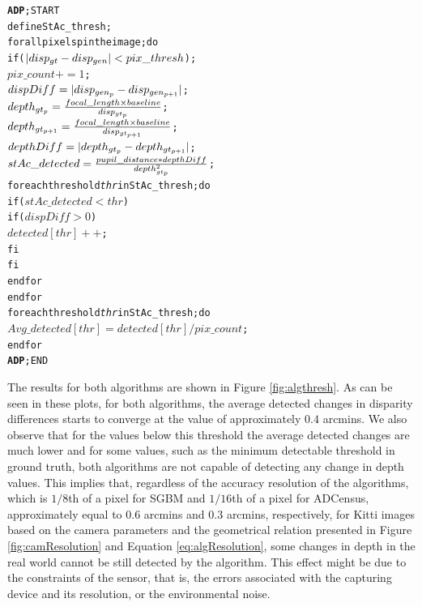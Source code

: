 \begin{alltt}
\textbf{ADP}; START
      define StAc\_thresh;
      for all pixels p in the image; do
         if (\( |disp\sb{gt}-disp\sb{gen}|<pix\_thresh\));
            \(pix\_count += 1\);
            \(dispDiff = |disp\sb{gen\sb{p}}-disp\sb{gen\sb{p+1}}|\);
            \(depth\sb{gt\sb{p}} = \frac{focal\_length \times baseline}{disp\sb{gt\sb{p}}}\);
            \(depth\sb{gt\sb{p+1}} = \frac{focal\_length \times baseline}{disp\sb{gt\sb{p+1}}}\);
            \(depthDiff = |depth\sb{gt\sb{p}}-depth\sb{gt\sb{p+1}}|\);
            \(stAc\_detected = \frac{pupil\_distance*depthDiff}{depth\sb{gt\sb{p}}\sp{2}}\);
            for each threshold \textit{thr} in StAc\_thresh; do
               if (\(stAc\_detected<thr\))
                  if (\(dispDiff>0\))
                     \(detected[thr]++\);
                  fi
               fi
            end for
      end for
      for each threshold \textit{thr} in StAc\_thresh; do
         \(Avg\_detected[thr] = detected[thr]/pix\_count\);
      end for
\textbf{ADP}; END
\end{alltt}
The results for both algorithms are shown in Figure \ref{fig:algthresh}.
As can be seen in these plots, for both algorithms, the average detected changes in disparity differences starts to converge at the value of approximately $0.4$ arcmins.
We also observe that for the values below this threshold the average detected changes are much lower and for some values, such as the minimum detectable threshold in ground truth,
both algorithms are not capable of detecting any change in depth values. 
This implies that, regardless of the accuracy resolution of the algorithms, which is $1/8$th of a pixel for SGBM and $1/16$th of a pixel for ADCensus, approximately equal to
$0.6$ arcmins and $0.3$ arcmins, respectively, for Kitti images based on the camera parameters and the geometrical relation presented in Figure \ref{fig:camResolution} and 
Equation \ref{eq:algResolution}, some changes in 
depth in the real world cannot be still detected by the algorithm. This effect might be due to the constraints of the sensor, that is, the errors associated with the capturing 
device and its resolution, or the environmental noise. 

